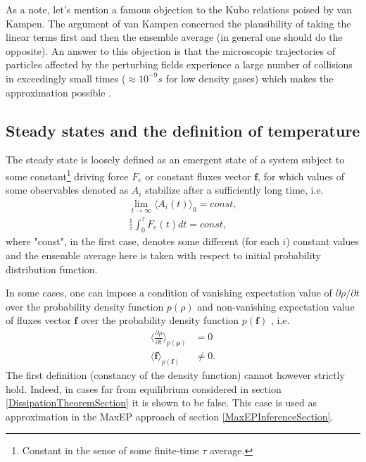 \documentclass[a4paper,12pt]{article}
\begin{document}
As a note, let's mention a famous objection to the Kubo relations poised by van Kampen. The argument of van Kampen concerned the plausibility of taking the linear terms first and then the ensemble average (in general one should do the opposite). An answer to this objection is that the microscopic trajectories of particles affected by the perturbing fields experience a large number of collisions in exceedingly small times ($\approx 10^{-9}s$ for low density gases) which makes the approximation possible \cite{Dorfman:ozm67-zD}.
\subsection{Steady states and the definition of temperature}

The steady state is loosely defined as an emergent state of a system subject to some constant\footnote{Constant in the sense of some finite-time $\tau$ average.} driving force $F_e$ or constant fluxes vector $\bm{f}$, for which values of some observables denoted as $A_i$ stabilize after a sufficiently long time, i.e.
\begin{equation}
\begin{aligned}
  \lim_{t \to \infty} \langle A_i(t) \rangle_0 = const,\\
  \frac{1}{\tau} \int_0^{\tau} F_e(t) dt =const,
\end{aligned}
\end{equation}
where "const", in the first case, denotes some different (for each $i$) constant values and the ensemble average here is taken with respect to initial probability distribution function.

In some cases, one can impose a condition of vanishing expectation value of $\partial \rho / \partial t$ over the probability density function $p(\rho)$ and non-vanishing expectation value of fluxes vector $\bm{f}$ over the probability density function $p(\bm{f})$ \cite{Dewar:2014ek}, i.e.
\begin{equation}
\begin{aligned}
\label{SteadyStates}
  \langle \frac{\partial \rho}{\partial t} \rangle_{p(\bm{\rho})} &= 0 \\
  \langle \bm{f} \rangle_{p(\bm{f})} &\neq 0.
\end{aligned}
\end{equation}
The first definition (constancy of the density function) cannot however strictly hold. Indeed, in cases far from equilibrium considered in section \ref{DissipationTheoremSection} it is shown to be false. This case is used as approximation in the MaxEP approach of section \ref{MaxEPInferenceSection}.
\end{document}
